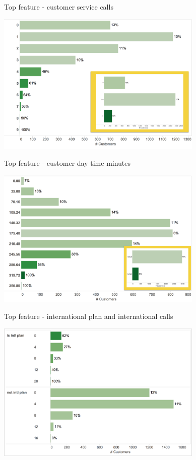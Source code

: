 \documentclass[10pt]{beamer}
\begin{document}
    \begin{frame}{Top feature - customer service calls}
      \begin{center}
        \includegraphics[width=280pt]{../graphs/top_var_cust_surv_with_group}
      \end{center}
    \end{frame}

    \begin{frame}{Top feature - customer day time minutes}
      \begin{center}
        \includegraphics[width=280pt]{../graphs/top_var_day_mins_with_group}
      \end{center}
    \end{frame}

    \begin{frame}{Top feature - international plan and international calls}
      \begin{center}
        \includegraphics[width=280pt]{../graphs/top_var_intl_plan_calls}
      \end{center}
    \end{frame}
\end{document}

